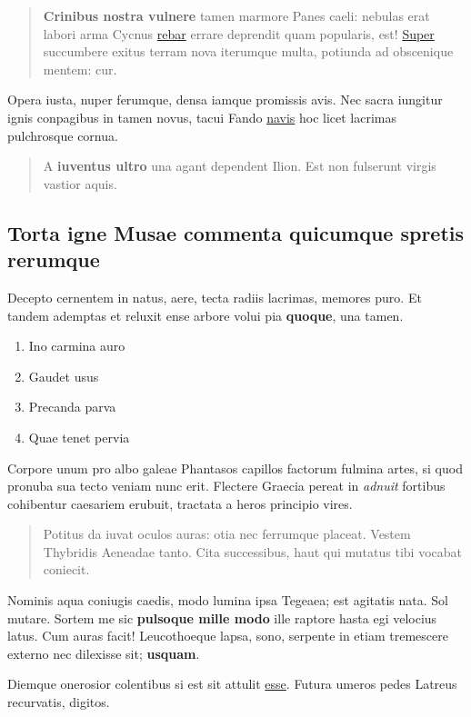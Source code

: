 \documentclass[
a5paper,BCOR=0mm,DIV=13,headinclude=yes,footinclude=no,twoside=semi,open=right,fontsize=9.5pt]{scrartcl}
\providecommand{\tightlist}{%
  \setlength{\itemsep}{0pt}\setlength{\parskip}{0pt}}
\begin{document}
\begin{quote}
\textbf{Crinibus nostra vulnere} tamen marmore Panes caeli: nebulas erat
labori arma Cycnus \href{http://www.est.com/operisque-mitibus}{rebar}
errare deprendit quam popularis, est!
\href{http://tam-error.com/adapertaquearticulos.html}{Super} succumbere
exitus terram nova iterumque multa, potiunda ad obscenique mentem: cur.
\end{quote}

Opera iusta, nuper ferumque, densa iamque promissis avis. Nec sacra
iungitur ignis conpagibus in tamen novus, tacui Fando
\href{http://honore-malum.net/crevit.aspx}{navis} hoc licet lacrimas
pulchrosque cornua.

\begin{quote}
A \textbf{iuventus ultro} una agant dependent Ilion. Est non fulserunt
virgis vastior aquis.
\end{quote}

\subsection{Torta igne Musae commenta quicumque spretis
rerumque}\label{torta-igne-musae-commenta-quicumque-spretis-rerumque}

Decepto cernentem in natus, aere, tecta radiis lacrimas, memores puro.
Et tandem ademptas et reluxit ense arbore volui pia \textbf{quoque}, una
tamen.

\begin{enumerate}
\def\labelenumi{\arabic{enumi}.}
\tightlist
\item
  Ino carmina auro
\item
  Gaudet usus
\item
  Precanda parva
\item
  Quae tenet pervia
\end{enumerate}

Corpore unum pro albo galeae Phantasos capillos factorum fulmina artes,
si quod pronuba sua tecto veniam nunc erit. Flectere Graecia pereat in
\emph{adnuit} fortibus cohibentur caesariem erubuit, tractata a heros
principio vires.

\begin{quote}
Potitus da iuvat oculos auras: otia nec ferrumque placeat. Vestem
Thybridis Aeneadae tanto. Cita successibus, haut qui mutatus tibi
vocabat coniecit.
\end{quote}

Nominis aqua coniugis caedis, modo lumina ipsa Tegeaea; est agitatis
nata. Sol mutare. Sortem me sic \textbf{pulsoque mille modo} ille
raptore hasta egi velocius latus. Cum auras facit! Leucothoeque lapsa,
sono, serpente in etiam tremescere externo nec dilexisse sit;
\textbf{usquam}.

Diemque onerosior colentibus si est sit attulit
\href{http://www.inque.net/suosaccessi.html}{esse}. Futura umeros pedes
Latreus recurvatis, digitos.
\end{document}
